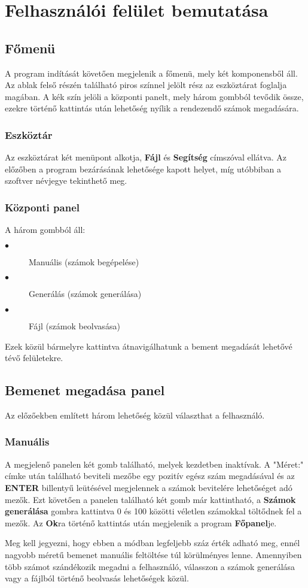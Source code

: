 \documentclass{elteikthesis}
\begin{document}
\section{Felhasználói felület bemutatása}
\subsection{Főmenü}
A program indítását követően megjelenik a főmenü, mely két komponensből áll.  Az ablak felső részén található piros színnel jelölt rész az eszköztárat foglalja magában. A kék szín jelöli a központi panelt, mely három gombból tevődik össze, ezekre történő kattintás után lehetőség nyílik a rendezendő számok megadására.

\subsubsection{Eszköztár}
Az eszköztárat két menüpont alkotja, \textbf{Fájl} és \textbf{Segítség} címszóval ellátva. Az előzőben a program bezárásának lehetősége kapott helyet, míg utóbbiban a szoftver névjegye tekinthető meg.

\subsubsection{Központi panel}
A három gombból áll:
\begin{description}
	\item[$\bullet$] Manuális (számok begépelése)
	\item[$\bullet$] Generálás (számok generálása) 
	\item[$\bullet$] Fájl (számok beolvasása)
\end{description}
Ezek közül bármelyre kattintva átnavigálhatunk a bement megadását lehetővé tévő felületekre.

\subsection{Bemenet megadása panel}
Az előzőekben említett három lehetőség közül választhat a felhasználó.

\subsubsection{Manuális}
A megjelenő panelen két gomb található, melyek kezdetben inaktívak. A "Méret:" címke után található beviteli mezőbe egy pozitív egész szám megadásával és az \textbf{ENTER} billentyű leütésével megjelennek a számok bevitelére lehetőséget adó mezők. Ezt követően a panelen található két gomb már kattintható, a \textbf{Számok generálása} gombra kattintva 0 és 100 közötti véletlen számokkal töltődnek fel a mezők. Az \textbf{Ok}ra történő kattintás után megjelenik a program \textbf{Főpanel}je.\par
Meg kell jegyezni, hogy ebben a módban legfeljebb száz érték adható meg, ennél nagyobb méretű bemenet manuális feltöltése túl körülményes lenne. Amennyiben több számot szándékozik megadni a felhasználó, válasszon a számok generálása vagy a fájlból történő beolvasás lehetőségek közül.
\end{document}
